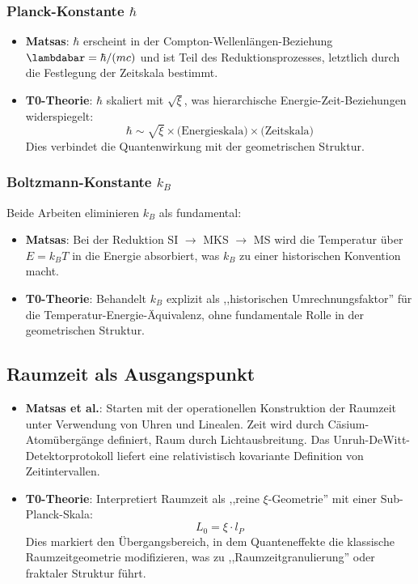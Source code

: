 	\subsubsection{Planck-Konstante $\hbar$}
	
	\begin{itemize}
		\item \textbf{Matsas}: $\hbar$ erscheint in der Compton-Wellenlängen-Beziehung $\lambdabar = \hbar/(mc)$ und ist Teil des Reduktionsprozesses, letztlich durch die Festlegung der Zeitskala bestimmt.
		
		\item \textbf{T0-Theorie}: $\hbar$ skaliert mit $\sqrt{\xi}$, was hierarchische Energie-Zeit-Beziehungen widerspiegelt:
		\[
		\hbar \sim \sqrt{\xi} \times \text{(Energieskala)} \times \text{(Zeitskala)}
		\]
		Dies verbindet die Quantenwirkung mit der geometrischen Struktur.
	\end{itemize}
	
	\subsubsection{Boltzmann-Konstante $k_B$}
	
	Beide Arbeiten eliminieren $k_B$ als fundamental:
	
	\begin{itemize}
		\item \textbf{Matsas}: Bei der Reduktion SI $\to$ MKS $\to$ MS wird die Temperatur über $E = k_B T$ in die Energie absorbiert, was $k_B$ zu einer historischen Konvention macht.
		
		\item \textbf{T0-Theorie}: Behandelt $k_B$ explizit als ,,historischen Umrechnungsfaktor'' für die Temperatur-Energie-Äquivalenz, ohne fundamentale Rolle in der geometrischen Struktur.
	\end{itemize}
	
	\subsection{Raumzeit als Ausgangspunkt}
	
	\begin{itemize}
		\item \textbf{Matsas et al.}: Starten mit der operationellen Konstruktion der Raumzeit unter Verwendung von Uhren und Linealen. Zeit wird durch Cäsium-Atomübergänge definiert, Raum durch Lichtausbreitung. Das Unruh-DeWitt-Detektorprotokoll liefert eine relativistisch kovariante Definition von Zeitintervallen.
		
		\item \textbf{T0-Theorie}: Interpretiert Raumzeit als ,,reine $\xi$-Geometrie'' mit einer Sub-Planck-Skala:
		\[
		L_0 = \xi \cdot l_P
		\]
		Dies markiert den Übergangsbereich, in dem Quanteneffekte die klassische Raumzeitgeometrie modifizieren, was zu ,,Raumzeitgranulierung'' oder fraktaler Struktur führt.
	\end{itemize}
	
